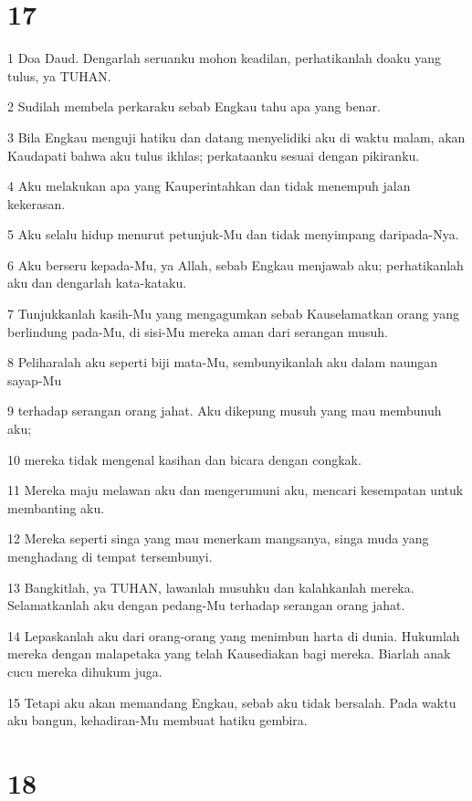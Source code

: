 \chapter{17}

\par 1 Doa Daud. Dengarlah seruanku mohon keadilan, perhatikanlah doaku yang tulus, ya TUHAN.
\par 2 Sudilah membela perkaraku sebab Engkau tahu apa yang benar.
\par 3 Bila Engkau menguji hatiku dan datang menyelidiki aku di waktu malam, akan Kaudapati bahwa aku tulus ikhlas; perkataanku sesuai dengan pikiranku.
\par 4 Aku melakukan apa yang Kauperintahkan dan tidak menempuh jalan kekerasan.
\par 5 Aku selalu hidup menurut petunjuk-Mu dan tidak menyimpang daripada-Nya.
\par 6 Aku berseru kepada-Mu, ya Allah, sebab Engkau menjawab aku; perhatikanlah aku dan dengarlah kata-kataku.
\par 7 Tunjukkanlah kasih-Mu yang mengagumkan sebab Kauselamatkan orang yang berlindung pada-Mu, di sisi-Mu mereka aman dari serangan musuh.
\par 8 Peliharalah aku seperti biji mata-Mu, sembunyikanlah aku dalam naungan sayap-Mu
\par 9 terhadap serangan orang jahat. Aku dikepung musuh yang mau membunuh aku;
\par 10 mereka tidak mengenal kasihan dan bicara dengan congkak.
\par 11 Mereka maju melawan aku dan mengerumuni aku, mencari kesempatan untuk membanting aku.
\par 12 Mereka seperti singa yang mau menerkam mangsanya, singa muda yang menghadang di tempat tersembunyi.
\par 13 Bangkitlah, ya TUHAN, lawanlah musuhku dan kalahkanlah mereka. Selamatkanlah aku dengan pedang-Mu terhadap serangan orang jahat.
\par 14 Lepaskanlah aku dari orang-orang yang menimbun harta di dunia. Hukumlah mereka dengan malapetaka yang telah Kausediakan bagi mereka. Biarlah anak cucu mereka dihukum juga.
\par 15 Tetapi aku akan memandang Engkau, sebab aku tidak bersalah. Pada waktu aku bangun, kehadiran-Mu membuat hatiku gembira.

\chapter{18}

